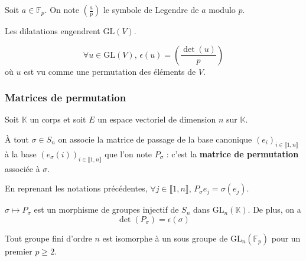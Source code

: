 
	\begin{notation}
		Soit $a \in \mathbb{F}_p$. On note $\left( \frac{a}{p} \right)$ le symbole de Legendre de $a$ modulo $p$.
	\end{notation}

	\begin{lemma}
		Les dilatations engendrent $\mathrm{GL}(V)$.
	\end{lemma}


	\begin{theorem}
		\[ \forall u \in \mathrm{GL}(V), \, \epsilon(u) = \left( \frac{\det(u)}{p} \right) \]
		où $u$ est vu comme une permutation des éléments de $V$.
	\end{theorem}

	\subsubsection{Matrices de permutation}


	Soit $\mathbb{K}$ un corps et soit $E$ un espace vectoriel de dimension $n$ sur $\mathbb{K}$.

	\begin{definition}
		À tout $\sigma \in S_n$ on associe la matrice de passage de la base canonique $(e_i)_{i \in \llbracket 1, n \rrbracket}$ à la base $(e_\sigma(i))_{i \in \llbracket 1, n \rrbracket}$ que l'on note $P_{\sigma}$ : c'est la \textbf{matrice de permutation} associée à $\sigma$.
	\end{definition}

	\begin{remark}
		En reprenant les notations précédentes, $\forall j \in \llbracket 1, n \rrbracket$, $P_{\sigma} e_j = \sigma(e_j)$.
	\end{remark}

	\begin{proposition}
		$\sigma \mapsto P_{\sigma}$ est un morphisme de groupes injectif de $S_n$ dans $\mathrm{GL}_n(\mathbb{K})$. De plus, on a
		\[ \det(P_{\sigma}) = \epsilon(\sigma) \]
	\end{proposition}

	\begin{corollary}
		Tout groupe fini d'ordre $n$ est isomorphe à un sous groupe de $\mathrm{GL}_n(\mathbb{F}_p)$ pour un premier $p \geq 2$.
	\end{corollary}

